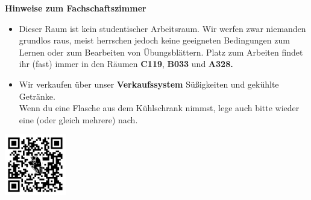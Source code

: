 \documentclass[12pt,a4paper]{article}
\begin{document}
\textbf{Hinweise zum Fachschaftszimmer}
\begin{itemize}
	\item Dieser Raum ist kein studentischer Arbeitsraum. Wir werfen zwar niemanden grundlos raus, meist herrschen jedoch keine geeigneten Bedingungen zum Lernen oder zum Bearbeiten von Übungsblättern. Platz zum Arbeiten findet ihr (fast) immer in den Räumen \textbf{C119}, \textbf{B033} und \textbf{A328.}
	\item Wir verkaufen über unser \textbf{Verkaufssystem} Süßigkeiten und gekühlte Getränke. \\ Wenn du eine Flasche aus dem Kühlschrank nimmst, lege auch bitte wieder eine (oder gleich mehrere) nach.
\end{itemize}

\vfill
\begin{flushright}
	\includegraphics[width=0.2\textwidth]{qrcode.png}
\end{flushright}
\end{document}
